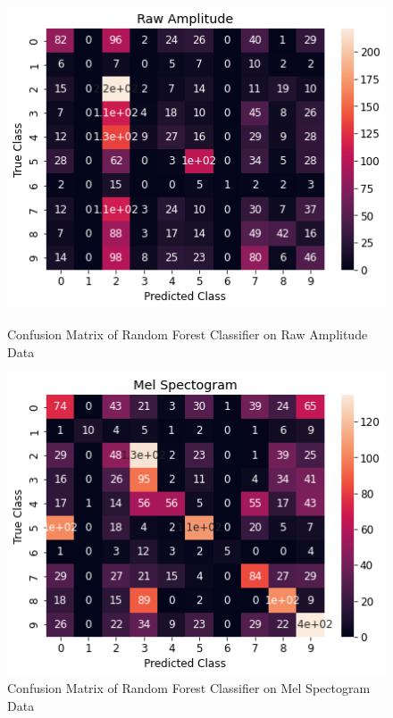 \documentclass[11pt]{article}
\begin{document}
\begin{itemize}
    \begin{figure}[h!]
        \centering
        \begin{minipage}{0.45\textwidth}
            \centering
            \includegraphics[width=1\textwidth]{amp_rf_cfm} %
            \caption{Confusion Matrix of Random Forest Classifier on Raw Amplitude Data}
        \end{minipage}\hfill
        \begin{minipage}{0.45\textwidth}
            \centering
            \includegraphics[width=1\textwidth]{mel_rf_cfm} %
            \caption{Confusion Matrix of Random Forest Classifier on Mel Spectogram Data}
        \end{minipage}
    \end{figure}
\end{itemize}
\end{document}

